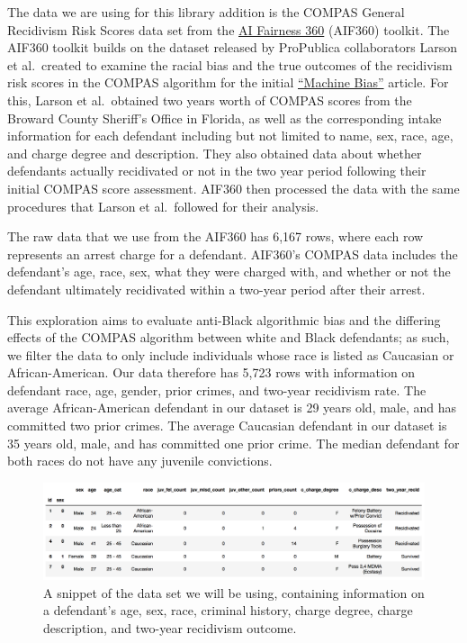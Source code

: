 \documentclass[water,article,submit,moreauthors,pdftex]{mdpi}
\begin{document}
The data we are using for this library addition is the COMPAS General
Recidivism Risk Scores data set from the
\href{https://aif360.readthedocs.io/en/stable/modules/generated/aif360.datasets.CompasDataset.html\#aif360.datasets.CompasDataset}{AI
Fairness 360} (AIF360) toolkit. The AIF360 toolkit builds on the dataset
released by ProPublica collaborators Larson et al.~created to examine
the racial bias and the true outcomes of the recidivism risk scores in
the COMPAS algorithm for the initial
\href{https://www.propublica.org/article/machine-bias-risk-assessments-in-criminal-sentencing}{``Machine
Bias''} article. For this, Larson et al.~obtained two years worth of
COMPAS scores from the Broward County Sheriff's Office in Florida, as
well as the corresponding intake information for each defendant
including but not limited to name, sex, race, age, and charge degree and
description. They also obtained data about whether defendants actually
recidivated or not in the two year period following their initial COMPAS
score assessment. AIF360 then processed the data with the same
procedures that Larson et al.~followed for their analysis.

The raw data that we use from the AIF360 has 6,167 rows, where each row
represents an arrest charge for a defendant. AIF360's COMPAS data
includes the defendant's age, race, sex, what they were charged with,
and whether or not the defendant ultimately recidivated within a
two-year period after their arrest.

This exploration aims to evaluate anti-Black algorithmic bias and the
differing effects of the COMPAS algorithm between white and Black
defendants; as such, we filter the data to only include individuals
whose race is listed as Caucasian or African-American. Our data
therefore has 5,723 rows with information on defendant race, age,
gender, prior crimes, and two-year recidivism rate. The average
African-American defendant in our dataset is 29 years old, male, and has
committed two prior crimes. The average Caucasian defendant in our
dataset is 35 years old, male, and has committed one prior crime. The
median defendant for both races do not have any juvenile convictions.

\begin{figure}

{\centering \includegraphics[width=1\linewidth]{../images/table_snippet} 

}

\caption{A snippet of the data set we will be using, containing information on a defendant's age, sex, race, criminal history, charge degree, charge description, and two-year recidivism outcome.}\label{fig:table snip}
\end{figure}
\end{document}
